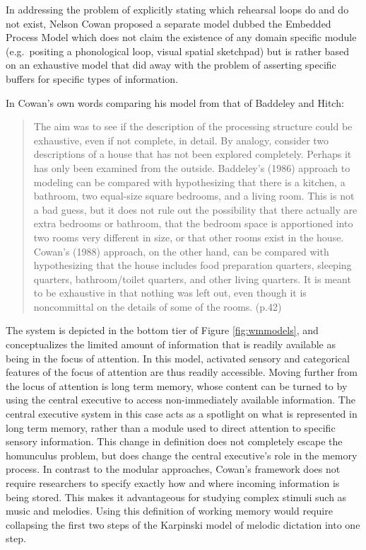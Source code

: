 \documentclass[]{book}
\begin{document}
In addressing the problem of explicitly stating which rehearsal loops do and do not exist, Nelson Cowan proposed a separate model \citep{cowanEvolvingConceptionsMemory1988, cowanWorkingMemoryCapacity2005} dubbed the Embedded Process Model which does not claim the existence of any domain specific module (e.g.~positing a phonological loop, visual spatial sketchpad) but is rather based on an exhaustive model that did away with the problem of asserting specific buffers for specific types of information.

In Cowan's own words comparing his model from that of Baddeley and Hitch:

\begin{quote}
The aim was to see if the description of the processing structure could be exhaustive, even if not complete, in detail. By analogy, consider two descriptions of a house that has not been explored completely. Perhaps it has only been examined from the outside. Baddeley's (1986) approach to modeling can be compared with hypothesizing that there is a kitchen, a bathroom, two equal-size square bedrooms, and a living room. This is not a bad guess, but it does not rule out the possibility that there actually are extra bedrooms or bathroom, that the bedroom space is apportioned into two rooms very different in size, or that other rooms exist in the house. Cowan's (1988) approach, on the other hand, can be compared with hypothesizing that the house includes food preparation quarters, sleeping quarters, bathroom/toilet quarters, and other living quarters. It is meant to be exhaustive in that nothing was left out, even though it is noncommittal on the details of some of the rooms. (p.42) \citep{cowanWorkingMemoryCapacity2005}
\end{quote}

The system is depicted in the bottom tier of Figure \ref{fig:wmmodels}, and conceptualizes the limited amount of information that is readily available as being in the focus of attention.
In this model, activated sensory and categorical features of the focus of attention are thus readily accessible.
Moving further from the locus of attention is long term memory, whose content can be turned to by using the central executive to access non-immediately available information.
The central executive system in this case acts as a spotlight on what is represented in long term memory, rather than a module used to direct attention to specific sensory information.
This change in definition does not completely escape the homunculus problem, but does change the central executive's role in the memory process.
In contrast to the modular approaches, Cowan's framework does not require researchers to specify exactly how and where incoming information is being stored.
This makes it advantageous for studying complex stimuli such as music and melodies.
Using this definition of working memory would require collapsing the first two steps of the Karpinski model of melodic dictation into one step.
\end{document}

